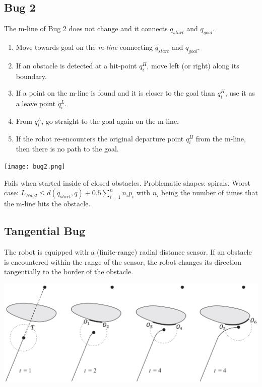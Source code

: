\begin{multicols*}{2}
\subsection{Bug 2}
The m-line of Bug 2 does not change and it connects $q_{start}$ and $q_{goal}$.
\begin{enumerate}
	\item Move towards goal on the \textit{m-line} connecting $q_{start}$ and $q_{goal}$.
	\item If an obstacle is detected at a hit-point $q^H_i$, move left (or right) along its boundary.
	\item If a point on the m-line is found and it is closer to the goal than $q^H_i$, use it as a leave point $q^L_i$.
	\item From $q^L_i$, go straight to the goal again on the m-line.
	\item If the robot re-encounters the original departure point $q^H_i$ from the m-line, then there is no path to the goal.
\end{enumerate}
\begin{center}
\texttt{[image: bug2.png]}
\end{center}

\noindent Fails when started inside of closed obstacles. Problematic shapes: spirals. Worst case: $L_{Bug2} \leq d(q_{start}, q)+0.5\sum_{i=1}^{n} n_i p_i$ with $n_i$ being the number of times that the m-line hits the obstacle.

\subsection{Tangential Bug}
The robot is equipped with a (finite-range) radial distance sensor. If an obstacle is encountered within the range of the sensor, the robot changes its direction tangentially to the border of the obstacle.

\begin{center}
	\includegraphics[width=\columnwidth]{tangential_bug.png}
\end{center}


\end{multicols*}
